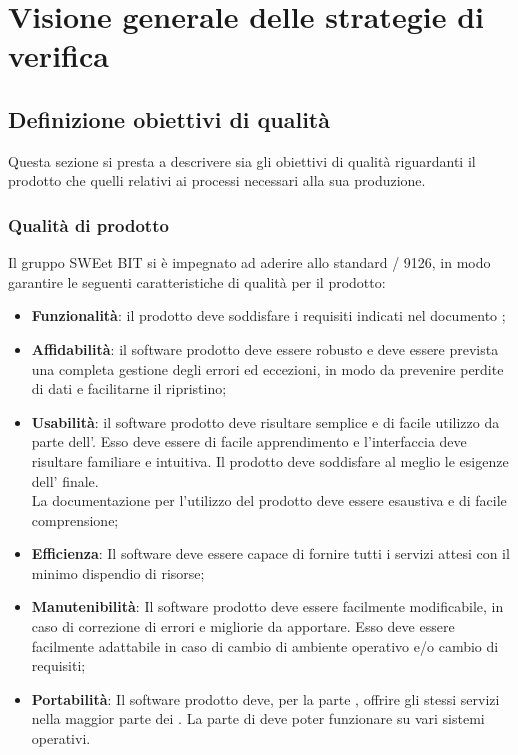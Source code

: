 \section{Visione generale delle strategie di verifica}
  \subsection{Definizione obiettivi di qualità}
  Questa sezione si presta a descrivere sia gli obiettivi di qualità riguardanti il prodotto
  che quelli relativi ai processi necessari alla sua produzione.
    \subsubsection{Qualità di prodotto}
    Il gruppo SWEet BIT si è impegnato ad aderire allo standard / 9126, in modo garantire
    le seguenti caratteristiche di qualità per il prodotto:
    \begin{itemize}
      \item \textbf{Funzionalità}: il prodotto deve soddisfare i requisiti indicati nel documento ;

      \item \textbf{Affidabilità}: il software prodotto deve essere robusto e deve essere prevista una completa gestione degli errori ed eccezioni,
       in modo da prevenire perdite di dati e facilitarne il ripristino;

      \item \textbf{Usabilità}: il software prodotto deve risultare semplice e di facile utilizzo da parte dell'.
      Esso deve essere di facile apprendimento e l'interfaccia  deve risultare familiare e intuitiva. Il prodotto deve soddisfare al meglio le esigenze dell' finale. \\
      La documentazione per l'utilizzo del prodotto deve essere esaustiva e di facile comprensione;

      \item \textbf{Efficienza}: Il software deve essere capace di fornire tutti i servizi attesi con il minimo dispendio di risorse;

      \item \textbf{Manutenibilità}: Il software prodotto deve essere facilmente modificabile, in caso di correzione di errori e migliorie da apportare. Esso deve essere facilmente
      adattabile in caso di cambio di ambiente operativo e/o cambio di requisiti;

      \item \textbf{Portabilità}: Il software prodotto deve, per la parte , offrire gli stessi servizi nella maggior parte dei .
      La parte di  deve poter funzionare su vari sistemi operativi.
    \end{itemize}

